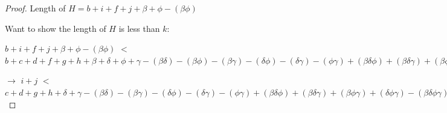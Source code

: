 \documentclass[manuscript]{acmart}
\begin{document}
\begin{proof}
        Length of $H = b + i + f + j + \beta + \phi - (\beta \phi)$
        
        Want to show the length of $H$ is less than $k$:

        $b + i + f + j + \beta + \phi - (\beta \phi)$
        $<$
        $b + c + d + f + g + h
            + \beta + \delta + \phi + \gamma
            - (\beta \delta) - (\beta \phi) - (\beta \gamma) - (\delta \phi) - (\delta \gamma) -(\phi \gamma)
            + (\beta \delta \phi) + (\beta \delta \gamma) + (\beta \phi \gamma) + (\delta \phi \gamma)
            - (\beta \delta \phi \gamma)
        $

        $\rightarrow$
        $i + j$
        $<$
        $c + d + g + h
            + \delta + \gamma
            - (\beta \delta) - (\beta \gamma) - (\delta \phi) - (\delta \gamma) -(\phi \gamma)
            + (\beta \delta \phi) + (\beta \delta \gamma) + (\beta \phi \gamma) + (\delta \phi \gamma)
            - (\beta \delta \phi \gamma)
        $



\end{proof}
\end{document}
